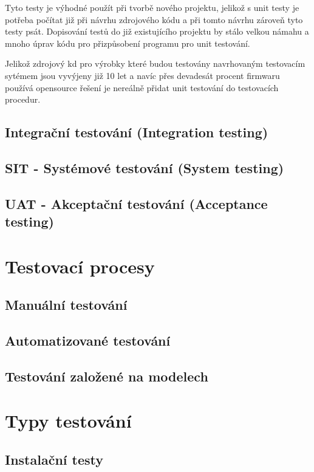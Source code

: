Tyto testy je výhodné použít při tvorbě nového projektu, jelikož s unit testy je potřeba počítat již při návrhu zdrojového kódu a při tomto návrhu zároveň tyto testy psát. Dopisování testů do již existujícího projektu by stálo velkou námahu a mnoho úprav kódu pro přizpůsobení programu pro unit testování.

Jelikož zdrojový kd pro výrobky které budou testovány navrhovaným testovacím sytémem jsou vyvýjeny již 10 let a navíc přes devadesát procent firmwaru používá opensource řešení je nereálně přidat unit testování do testovacích procedur.


\subsection{Integrační testování (Integration testing)}


\subsection{SIT - Systémové testování (System testing)}


\subsection{UAT - Akceptační testování (Acceptance testing)}


\section{Testovací procesy}
\subsection{Manuální testování}
\subsection{Automatizované testování}
\subsection{Testování založené na modelech}


\section{Typy testování}

\subsection{Instalační testy}
